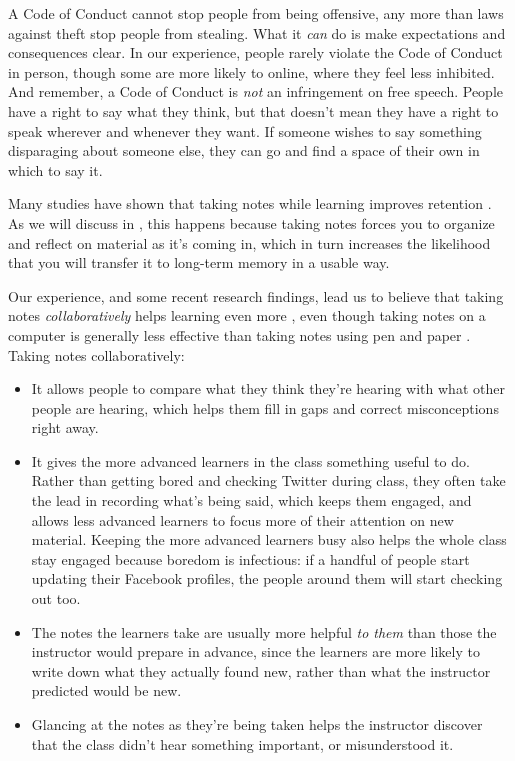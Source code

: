 A Code of Conduct cannot stop people from being offensive, any more
than laws against theft stop people from stealing. What it \emph{can}
do is make expectations and consequences clear.  In our experience,
people rarely violate the Code of Conduct in person, though some are
more likely to online, where they feel less inhibited.  And remember,
a Code of Conduct is \emph{not} an infringement on free speech.
People have a right to say what they think, but that doesn't mean they
have a right to speak wherever and whenever they want.  If someone
wishes to say something disparaging about someone else, they can go
and find a space of their own in which to say it.


Many studies have shown that taking notes while learning improves
retention \cite{bib:aiken-note-taking,bib:bohay-note-taking}.  As we
will discuss in , this happens because taking notes
forces you to organize and reflect on material as it's coming in,
which in turn increases the likelihood that you will transfer it to
long-term memory in a usable way.

Our experience, and some recent research findings, lead us to believe
that taking notes \emph{collaboratively} helps learning even
more \cite{bib:orndorff-note-taking}, even though taking notes on a
computer is generally less effective than taking notes using pen and
paper \cite{bib:mueller-note-taking}.  Taking notes collaboratively:

\begin{itemize}

\item
  It allows people to compare what they think they're hearing with
  what other people are hearing, which helps them fill in gaps and
  correct misconceptions right away.

\item
  It gives the more advanced learners in the class something useful to
  do.  Rather than getting bored and checking Twitter during class,
  they often take the lead in recording what's being said, which keeps
  them engaged, and allows less advanced learners to focus more of
  their attention on new material.  Keeping the more advanced learners
  busy also helps the whole class stay engaged because boredom is
  infectious: if a handful of people start updating their Facebook
  profiles, the people around them will start checking out too.

\item
  The notes the learners take are usually more helpful \emph{to them}
  than those the instructor would prepare in advance, since the learners
  are more likely to write down what they actually found new, rather than
  what the instructor predicted would be new.

\item
  Glancing at the notes as they're being taken helps the instructor
  discover that the class didn't hear something important, or
  misunderstood it.

\end{itemize}

